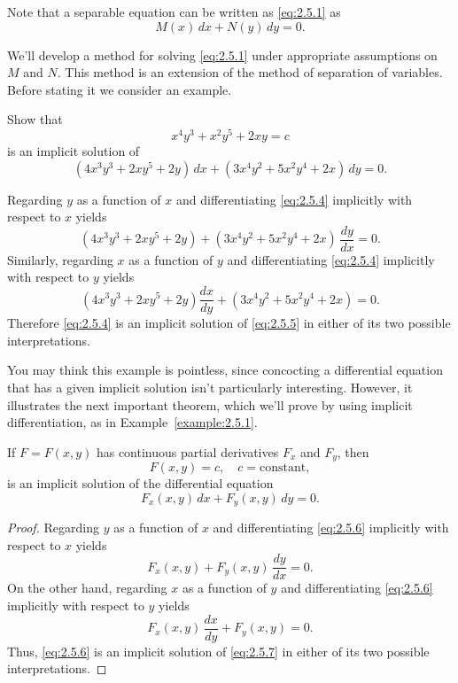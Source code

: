 \documentclass{ximera}
\begin{document}
Note that a separable equation can be written as
\eqref{eq:2.5.1} as
$$
M(x)\,dx+N(y)\,dy=0.
$$
 
 
We'll  develop a method for solving \eqref{eq:2.5.1} under appropriate
assumptions on $M$ and $N$. This method is an extension
of the method of separation of variables.
Before stating it we
consider an  example.
 
\begin{example}\label{example:2.5.1}
Show that
\begin{equation} \label{eq:2.5.4}
x^4y^3+x^2y^5+2xy=c
\end{equation}
is an implicit solution of
\begin{equation} \label{eq:2.5.5}
(4x^3y^3+2xy^5+2y)\,dx+(3x^4y^2+5x^2y^4+2x)\,dy=0.
\end{equation}
 
\begin{explanation}
Regarding $y$ as a function of $x$ and
differentiating \eqref{eq:2.5.4} implicitly with respect to
$x$ yields
$$
(4x^3y^3+2xy^5+2y)+(3x^4y^2+5x^2y^4+2x)\,\frac{dy}{dx}=0.
$$
Similarly, regarding $x$ as a function of $y$ and
differentiating \eqref{eq:2.5.4} implicitly with respect to
$y$ yields
$$
(4x^3y^3+2xy^5+2y)\frac{dx}{dy}+(3x^4y^2+5x^2y^4+2x)=0.
$$
Therefore \eqref{eq:2.5.4} is an implicit solution of \eqref{eq:2.5.5}
in either of its two possible interpretations.
\end{explanation}
\end{example}
 
You may think this example is pointless, since
concocting a differential equation that has a given implicit solution
isn't particularly interesting. However, it illustrates the
next important theorem, which  we'll prove by using implicit
differentiation,  as  in  Example~\ref{example:2.5.1}.
 
\begin{theorem}\label{thmtype:2.5.1}
If $F=F(x,y)$ has continuous partial derivatives
$F_x$ and $F_y$, then
\begin{equation} \label{eq:2.5.6}
F(x,y)=c,\quad c=\text{constant},
\end{equation}
is an implicit solution of the differential equation
\begin{equation} \label{eq:2.5.7}
F_x(x,y)\,dx+F_y(x,y)\,dy=0.
\end{equation}
\end{theorem}
 
\begin{proof} Regarding $y$ as a function of $x$ and  differentiating
\eqref{eq:2.5.6}  implicitly with respect to $x$ yields
$$
F_x(x,y)+F_y(x,y)\,\frac{dy}{dx}=0.
$$
On the other hand,
 regarding $x$ as a function of $y$ and  differentiating
\eqref{eq:2.5.6}  implicitly with respect to $y$ yields
$$
F_x(x,y)\,\frac{dx}{dy}+F_y(x,y)=0.
$$
Thus, \eqref{eq:2.5.6} is an
implicit solution of  \eqref{eq:2.5.7} in either of its two possible
interpretations.
\end{proof}
 
\end{document}

